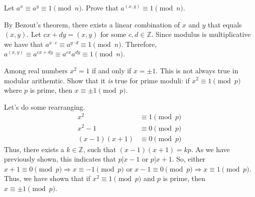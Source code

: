 \documentclass{article}
\begin{document}
\begin{problem}{}{}
    Let $a^x\equiv a^y \equiv 1\pmod{n}$. Prove that $a^{(x,y)}\equiv1\pmod{n}$.
\end{problem}
\begin{solution}{}{}
    By Bezout's theorem, there exists a linear combination of $x$ and $y$ that equals $(x,y)$. Let $cx+dy=(x,y)$ for some $c,d\in\mathbb{Z}$. Since modulus is multiplicative we have that $a^{x\cdot c}\equiv a^{y\cdot d}\equiv 1\pmod{n}$. Therefore, $a^{(x,y)}\equiv a^{cx+dy}\equiv a^{cx}a^{dy}\equiv1\pmod{n}$.
\end{solution}

\begin{problem}{}{}
    Among real numbers $x^2=1$ if and only if $x=\pm1$. This is not always true in modular arithemtic. Show that it \textit{is} true for prime moduli: if $x^2\equiv1\pmod{p}$ where $p$ is prime, then $x\equiv\pm1\pmod{p}$.
\end{problem}
\begin{solution}{}{}
    Let's do some rearranging.
    \begin{align*}
        x^2 &\equiv 1 \pmod{p} \\
        x^2-1 &\equiv 0 \pmod{p} \\
        (x-1)(x+1) &\equiv 0 \pmod{p}
    \end{align*}
    Thus, there exists a $k\in\mathbb{Z}$, such that $(x-1)(x+1)=kp$. As we have previously shown, this indicates that $p|x-1$ or $p|x+1$. So, either $x+1\equiv 0 \pmod{p}\Rightarrow x\equiv -1 \pmod{p}$ or $x-1\equiv 0 \pmod{p}\Rightarrow x\equiv 1 \pmod{p}$. Thus, we have shown that if $x^2\equiv1\pmod{p}$ and $p$ is prime, then $x\equiv\pm1\pmod{p}$.
\end{solution}
\end{document}
